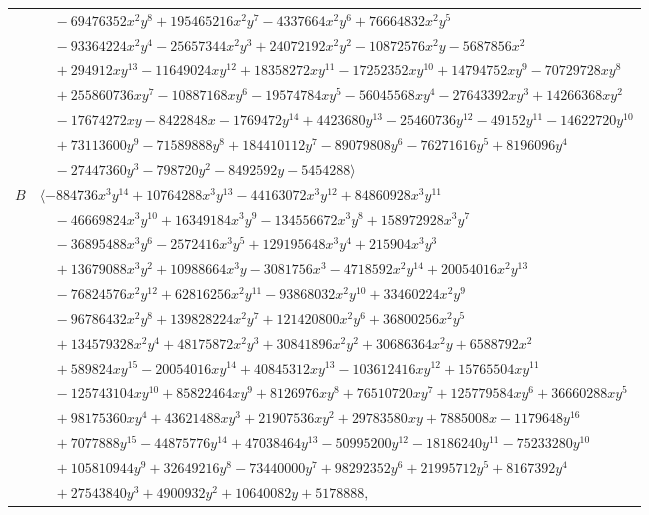 \documentclass[11pt]{article}
\begin{document}
\begin{longtable}{@{}ll@{}}
 & $\quad -69476352x^{2}y^{8}+195465216x^{2}y^{7}-4337664x^{2}y^{6}+76664832x^{2}y^{5}$\\
 & $\quad -93364224x^{2}y^{4}-25657344x^{2}y^{3}+24072192x^{2}y^{2}-10872576x^{2}y-5687856x^{2}$\\
 & $\quad +294912xy^{13}-11649024xy^{12}+18358272xy^{11}-17252352xy^{10}+14794752xy^{9}-70729728xy^{8}$\\
 & $\quad +255860736xy^{7}-10887168xy^{6}-19574784xy^{5}-56045568xy^{4}-27643392xy^{3}+14266368xy^{2}$\\
 & $\quad -17674272xy-8422848x-1769472y^{14}+4423680y^{13}-25460736y^{12}-49152y^{11}-14622720y^{10}$\\
 & $\quad +73113600y^{9}-71589888y^{8}+184410112y^{7}-89079808y^{6}-76271616y^{5}+8196096y^{4}$\\
 & $\quad -27447360y^{3}-798720y^{2}-8492592y-5454288\rangle$\\
$B$ & $\langle -884736x^{3}y^{14}+10764288x^{3}y^{13}-44163072x^{3}y^{12}+84860928x^{3}y^{11}$\\
 & $\quad -46669824x^{3}y^{10}+16349184x^{3}y^{9}-134556672x^{3}y^{8}+158972928x^{3}y^{7}$\\
 & $\quad -36895488x^{3}y^{6}-2572416x^{3}y^{5}+129195648x^{3}y^{4}+215904x^{3}y^{3}$\\
 & $\quad +13679088x^{3}y^{2}+10988664x^{3}y-3081756x^{3}-4718592x^{2}y^{14}+20054016x^{2}y^{13}$\\
 & $\quad -76824576x^{2}y^{12}+62816256x^{2}y^{11}-93868032x^{2}y^{10}+33460224x^{2}y^{9}$\\
 & $\quad -96786432x^{2}y^{8}+139828224x^{2}y^{7}+121420800x^{2}y^{6}+36800256x^{2}y^{5}$\\
 & $\quad +134579328x^{2}y^{4}+48175872x^{2}y^{3}+30841896x^{2}y^{2}+30686364x^{2}y+6588792x^{2}$\\
 & $\quad +589824xy^{15}-20054016xy^{14}+40845312xy^{13}-103612416xy^{12}+15765504xy^{11}$\\
 & $\quad -125743104xy^{10}+85822464xy^{9}+8126976xy^{8}+76510720xy^{7}+125779584xy^{6}+36660288xy^{5}$\\
 & $\quad +98175360xy^{4}+43621488xy^{3}+21907536xy^{2}+29783580xy+7885008x-1179648y^{16}$\\
 & $\quad +7077888y^{15}-44875776y^{14}+47038464y^{13}-50995200y^{12}-18186240y^{11}-75233280y^{10}$\\
 & $\quad +105810944y^{9}+32649216y^{8}-73440000y^{7}+98292352y^{6}+21995712y^{5}+8167392y^{4}$\\
 & $\quad +27543840y^{3}+4900932y^{2}+10640082y+5178888,$\\

\end{longtable}
\end{document}
